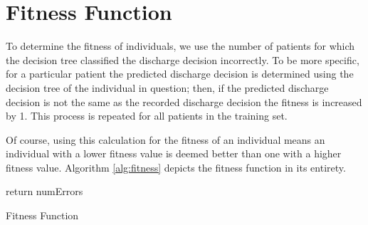 \section{Fitness Function}\label{sec:fitness}
To determine the fitness of individuals, we use the number of patients for which the decision tree classified the discharge decision incorrectly. To be more specific, for a particular patient the predicted discharge decision is determined using the decision tree of the individual in question; then, if the predicted discharge decision is not the same as the recorded discharge decision the fitness is increased by 1. This process is repeated for all patients in the training set.

Of course, using this calculation for the fitness of an individual means an individual with a lower fitness value is deemed better than one with a higher fitness value. Algorithm \ref{alg:fitness} depicts the fitness function in its entirety.

\begin{algorithm}[H]\label{alg:fitness}
\SetAlgoLined
 \BlankLine
 return numErrors\;
 \caption{Fitness Function}
\end{algorithm}
